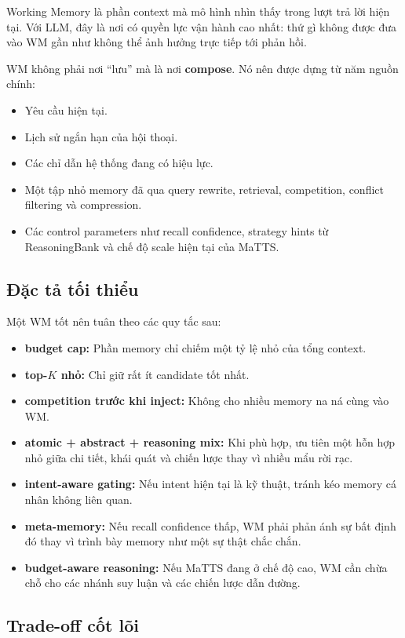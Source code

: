 \documentclass[a4paper,12pt]{article}
\begin{document}
Working Memory là phần context mà mô hình nhìn thấy trong lượt trả lời hiện tại. Với LLM, đây là nơi có quyền lực vận hành cao nhất: thứ gì không được đưa vào WM gần như không thể ảnh hưởng trực tiếp tới phản hồi.

WM không phải nơi ``lưu'' mà là nơi \textbf{compose}. Nó nên được dựng từ năm nguồn chính:
\begin{itemize}
    \item Yêu cầu hiện tại.
    \item Lịch sử ngắn hạn của hội thoại.
    \item Các chỉ dẫn hệ thống đang có hiệu lực.
    \item Một tập nhỏ memory đã qua query rewrite, retrieval, competition, conflict filtering và compression.
    \item Các control parameters như recall confidence, strategy hints từ ReasoningBank và chế độ scale hiện tại của MaTTS.
\end{itemize}

\subsection*{Đặc tả tối thiểu}

Một WM tốt nên tuân theo các quy tắc sau:
\begin{itemize}
    \item \textbf{budget cap:} Phần memory chỉ chiếm một tỷ lệ nhỏ của tổng context.
    \item \textbf{top-$K$ nhỏ:} Chỉ giữ rất ít candidate tốt nhất.
    \item \textbf{competition trước khi inject:} Không cho nhiều memory na ná cùng vào WM.
    \item \textbf{atomic + abstract + reasoning mix:} Khi phù hợp, ưu tiên một hỗn hợp nhỏ giữa chi tiết, khái quát và chiến lược thay vì nhiều mẩu rời rạc.
    \item \textbf{intent-aware gating:} Nếu intent hiện tại là kỹ thuật, tránh kéo memory cá nhân không liên quan.
    \item \textbf{meta-memory:} Nếu recall confidence thấp, WM phải phản ánh sự bất định đó thay vì trình bày memory như một sự thật chắc chắn.
    \item \textbf{budget-aware reasoning:} Nếu MaTTS đang ở chế độ cao, WM cần chừa chỗ cho các nhánh suy luận và các chiến lược dẫn đường.
\end{itemize}

\subsection*{Trade-off cốt lõi}
\end{document}
